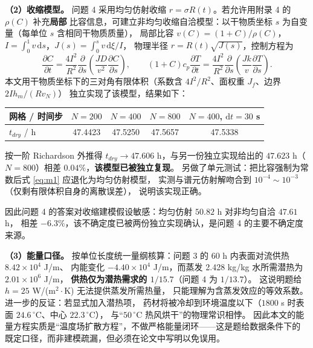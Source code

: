 \documentclass[12pt,a4paper]{ctexart}
\newcommand{\ud}{\mathrm{d}}
\begin{document}
\textbf{（2）收缩模型。}
问题 4 采用均匀仿射收缩 $r=\sigma R(t)$。若允许用附录 4 的 $\rho(C)$ 补充\textbf{局部}
比容信息，可建立非均匀收缩自洽模型：以干物质坐标 $s$ 为自变量（每单位 $s$ 含相同干物质质量），
局部比容 $v(C)=(1+C)/\rho(C)$，$I=\int_0^1v\,\ud s$，$J(s)=\int_0^sv\,\ud\xi/I$，
物理半径 $r=R(t)\sqrt{J(s)}$，控制方程为
\begin{equation}
\frac{\partial C}{\partial t}=\frac{4I^2}{R^2}\frac{\partial}{\partial s}
\!\left(\frac{JD}{v^2}\frac{\partial C}{\partial s}\right),\qquad
(1+C)c_p\frac{\partial T}{\partial t}=\frac{4I^2}{R^2}\frac{\partial}{\partial s}
\!\left(\frac{Jk}{v}\frac{\partial T}{\partial s}\right).
\label{eq:m1}
\end{equation}
本文用干物质坐标下的三对角有限体积（系数含 $4I^2/R^2$、面权重 $J_f$、边界 $2Ih_m/(Rv_N)$）
独立实现了该模型，结果如下：

\begin{center}
\small
\begin{tabular}{@{}lcccc@{}}
\toprule
网格 / 时间步 & $N=200$ & $N=400$ & $N=800$ & $N=400$, $\ud t=30$ s \\
\midrule
$t_{dry}$ / h & 47.4423 & 47.5250 & 47.5657 & 47.5338 \\
\bottomrule
\end{tabular}
\end{center}

\noindent 按一阶 Richardson 外推得 $t_{dry}\to47.606$ h，与另一份独立实现给出的
$47.623$ h（$N=800$）相差 $0.04\%$，\textbf{该模型已被独立复现}。
另做了单元测试：把比容强制为常数后式 \eqref{eq:m1} 应退化为均匀仿射模型，
实测与谱元仿射解吻合到 $10^{-4}\sim10^{-3}$（仅剩有限体积自身的离散误差），
说明该实现正确。

因此问题 4 的答案对收缩建模假设敏感：均匀仿射 $50.82$ h 对非均匀自洽 $47.61$ h，
相差 $-6.3\%$，该不确定度已被两份独立实现确认，是问题 4 的主要不确定度来源。

\textbf{（3）能量口径。}
按单位长度统一量纲核算：问题 3 的 60 h 内表面对流供热 $8.42\times10^4$ J/m、
内能变化 $-4.40\times10^4$ J/m，而蒸发 2.428 kg/kg 水所需潜热为 $2.01\times10^6$ J/m，
\textbf{供热仅为潜热需求的 $1/15.7$}（问题 4 为 $1/13.7$）。
这说明题给 $h=25$ W/(m$^2\cdot$K) 无法提供蒸发所需热量，
只能理解为含蒸发效应的等效系数。进一步的反证：若显式加入潜热项，
药材将被冷却到环境温度以下（$1800$ s 时表面 $24.6\,^\circ$C、中心 $22.3\,^\circ$C），
与“$50\,^\circ$C 热风烘干”的物理常识相悖。
因此本文的能量方程实质是“温度场扩散方程”，不做严格能量闭环——这是题给数据条件下的
既定口径，而非建模疏漏，但必须在论文中写明以免误用。
\end{document}
